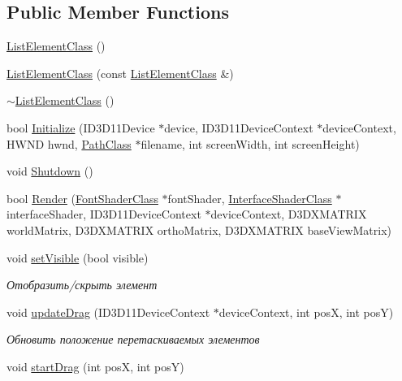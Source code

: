 \subsection*{Public Member Functions}
\begin{DoxyCompactItemize}
\item 
\hyperlink{class_list_element_class_a664f29e4c557a150f19c8209cfbf86f2}{List\+Element\+Class} ()
\item 
\hyperlink{class_list_element_class_a68de859bc0e03306f6660538339b7360}{List\+Element\+Class} (const \hyperlink{class_list_element_class}{List\+Element\+Class} \&)
\item 
\hyperlink{class_list_element_class_a6689396e5558f4770060964ca79de059}{$\sim$\+List\+Element\+Class} ()
\item 
bool \hyperlink{class_list_element_class_a1e11770280b39bce2cb887ec6c03b182}{Initialize} (I\+D3\+D11\+Device $\ast$device, I\+D3\+D11\+Device\+Context $\ast$device\+Context, H\+W\+ND hwnd, \hyperlink{class_path_class}{Path\+Class} $\ast$filename, int screen\+Width, int screen\+Height)
\item 
void \hyperlink{class_list_element_class_a7238c462dd3783162f5ccf213b9f55f1}{Shutdown} ()
\item 
bool \hyperlink{class_list_element_class_a646a703bc701884f664769fab21b25d6}{Render} (\hyperlink{class_font_shader_class}{Font\+Shader\+Class} $\ast$font\+Shader, \hyperlink{class_interface_shader_class}{Interface\+Shader\+Class} $\ast$interface\+Shader, I\+D3\+D11\+Device\+Context $\ast$device\+Context, D3\+D\+X\+M\+A\+T\+R\+IX world\+Matrix, D3\+D\+X\+M\+A\+T\+R\+IX ortho\+Matrix, D3\+D\+X\+M\+A\+T\+R\+IX base\+View\+Matrix)
\item 
void \hyperlink{class_list_element_class_a0d9f88e3b8079aec852bac9e83e0d954}{set\+Visible} (bool visible)
\begin{DoxyCompactList}\small\item\em Отобразить/скрыть элемент \end{DoxyCompactList}\item 
void \hyperlink{class_list_element_class_a251ae7920112c0ab8ee9108982431436}{update\+Drag} (I\+D3\+D11\+Device\+Context $\ast$device\+Context, int posX, int posY)
\begin{DoxyCompactList}\small\item\em Обновить положение перетаскиваемых элементов \end{DoxyCompactList}\item 
void \hyperlink{class_list_element_class_a4e3e228819764836ddf2904396b903a9}{start\+Drag} (int posX, int posY)

\end{DoxyCompactItemize}
